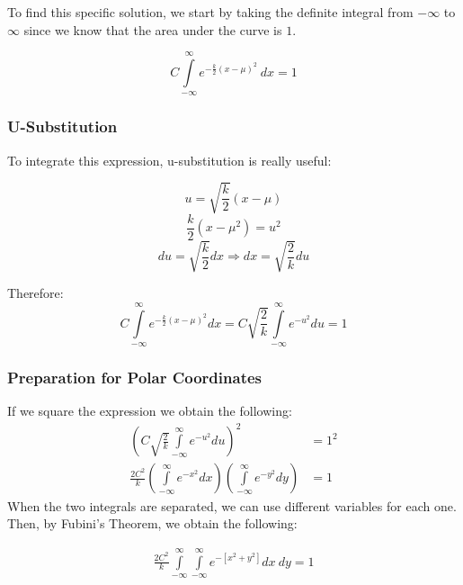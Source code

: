 \documentclass{article}
\begin{document}
To find this specific solution, we start by taking the definite integral from
$-\infty$ to $\infty$ since we know that the area under the curve is $1$.

\begin{equation}
  C\int\limits_{-\infty}^{\infty}e^{-\frac{k}{2}\left(x-\mu\right)^2}\ dx=1
\end{equation}

\subsubsection{U-Substitution}

To integrate this expression, u-substitution is really useful:

\begin{multicols}{3}
  \begin{equation}
    u=\sqrt{\frac{k}{2}}(x-\mu)
  \end{equation}
  \vfill\columnbreak
  \begin{equation}
    \frac{k}{2}(x-\mu^2)=u^2
  \end{equation}
  \vfill\columnbreak
  \begin{equation}
    du=\sqrt{\frac{k}{2}}dx\Longrightarrow dx=\sqrt{\frac{2}{k}}du
  \end{equation}
\end{multicols}
Therefore:
\begin{equation}
  C\int\limits_{-\infty}^{\infty}e^{-\frac{k}{2}(x-\mu)^2}dx=C\sqrt{\frac{2}{k}} \int\limits_{-\infty}^{\infty}e^{-u^2}du=1
\end{equation}

\subsubsection{Preparation for Polar Coordinates}

If we square the expression we obtain the following:
\begin{align}
  \left( C\sqrt{\frac{2}{k}}\int\limits_{-\infty}^{\infty}e^{-u^2}du \right)^2&=1^2\\
  \frac{2C^2}{k}\left( \int\limits_{-\infty}^{\infty}e^{-x^2}dx \right)  \left(\int\limits_{-\infty}^{\infty}e^{-y^2}dy \right)&=1
\end{align}
When the two integrals are separated, we can use different variables for each
one. Then, by Fubini's Theorem, we obtain the following:

\begin{align}
  \frac{2C^2}{k}\int\limits_{-\infty}^{\infty}\int\limits_{-\infty}^{\infty}e^{-\left[ x^2+y^2 \right]} dx\ dy = 1
\end{align}
\end{document}
